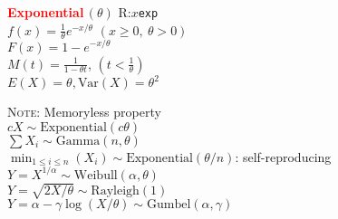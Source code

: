 \documentclass[10pt]{article}
\newenvironment{LIST}[1]{\begin{list}{}
                          { \settowidth{\labelwidth}{#1}
                            \setlength{\leftmargin}{\labelwidth}
                            \addtolength{\leftmargin}{\labelsep}
                            \setlength{\parsep}{0.5ex plus0.2ex minus0.2ex}
                            \setlength{\itemsep}{0ex plus0.2ex}
                            \renewcommand{\makelabel}[1]{##1\hfill}
                          }
                        }
                        {\end{list}}
\begin{document}
\begin{multicols}{2}
\begin{small}
\begin{enumerate}
\item \textcolor{red}{\bfseries\textsf{Exponential}}\,$(\theta)$ \hfill\textsf{R:}$x$\texttt{\color{red}exp}\\
      $f(x) = \displaystyle\frac{1}{\theta} e^{-x/\theta}$ $(x\ge0,~ \theta>0)$\\
      $F(x) = 1 - e^{-x/\theta}$ \\
      $M(t) = \displaystyle\frac{1}{1-\theta t}$, $(t < \frac{1}{\theta})$ \\
      $E(X)=\theta, \textrm{Var}(X)=\theta^2$
      \begin{LIST}{\textsc{Note:}}
      \item[\textsc{Note:}] Memoryless property\\
            $cX \sim \textrm{Exponential}(c\theta)$\\
            $\sum X_i \sim\mathrm{Gamma}(n,\theta)$\\
            $\displaystyle\min_{1\le i\le n}(X_i) \sim \textrm{Exponential}(\theta/n)$: self-reproducing\\
            $Y = X^{1/\alpha} \sim \textrm{Weibull}(\alpha,\theta)$\\
            $Y = \sqrt{2X/\theta} \sim \textrm{Rayleigh}(1)$\\
            $Y = \alpha-\gamma\log(X/\theta) \sim \textrm{Gumbel}(\alpha,\gamma)$
      \end{LIST}


\end{enumerate}
\end{small}
\end{multicols}
\end{document}
